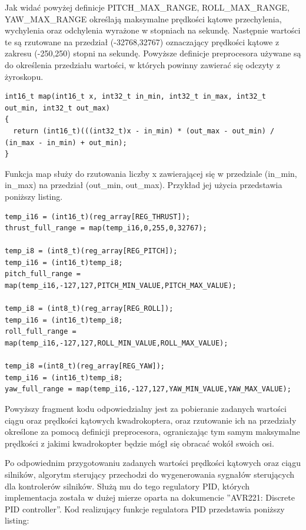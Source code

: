 Jak widać powyżej definicje PITCH\_MAX\_RANGE, ROLL\_MAX\_RANGE, YAW\_MAX\_RANGE określają maksymalne prędkości kątowe przechylenia, wychylenia oraz odchylenia wyrażone w stopniach na sekundę. Następnie wartości te są rzutowane na przedział (-32768,32767) oznaczający prędkości kątowe z zakresu (-250,250) stopni na sekundę. Powyższe definicje preprocesora używane są do określenia przedziału wartości, w których powinny zawierać się odczyty z żyroskopu.

\begin{lstlisting}
int16_t map(int16_t x, int32_t in_min, int32_t in_max, int32_t out_min, int32_t out_max)
{
  return (int16_t)(((int32_t)x - in_min) * (out_max - out_min) / (in_max - in_min) + out_min);
}
\end{lstlisting}

Funkcja map służy do rzutowania liczby x zawierającej się w przedziale (in\_min, in\_max) na przedział (out\_min, out\_max). Przykład jej użycia przedstawia poniższy listing.

\begin{lstlisting}
temp_i16 = (int16_t)(reg_array[REG_THRUST]);
thrust_full_range = map(temp_i16,0,255,0,32767);

temp_i8 = (int8_t)(reg_array[REG_PITCH]);
temp_i16 = (int16_t)temp_i8;
pitch_full_range = map(temp_i16,-127,127,PITCH_MIN_VALUE,PITCH_MAX_VALUE);

temp_i8 = (int8_t)(reg_array[REG_ROLL]);
temp_i16 = (int16_t)temp_i8;
roll_full_range = map(temp_i16,-127,127,ROLL_MIN_VALUE,ROLL_MAX_VALUE);

temp_i8 =(int8_t)(reg_array[REG_YAW]);
temp_i16 = (int16_t)temp_i8;
yaw_full_range = map(temp_i16,-127,127,YAW_MIN_VALUE,YAW_MAX_VALUE);
\end{lstlisting}

Powyższy fragment kodu odpowiedzialny jest za pobieranie zadanych wartości ciągu oraz prędkości kątowych kwadrokoptera, oraz rzutowanie ich na przedziały określone za pomocą definicji preprocesora, ograniczając tym samym maksymalne prędkości z jakimi kwadrokopter będzie mógł się obracać wokół swoich osi.

Po odpowiednim przygotowaniu zadanych wartości prędkości kątowych oraz ciągu silników, algorytm sterujący przechodzi do wygenerowania sygnałów sterujących dla kontrolerów silników. Służą mu do tego regulatory PID, których implementacja została w dużej mierze oparta na dokumencie ''AVR221: Discrete PID controller''. Kod realizujący funkcje regulatora PID przedstawia poniższy listing:

